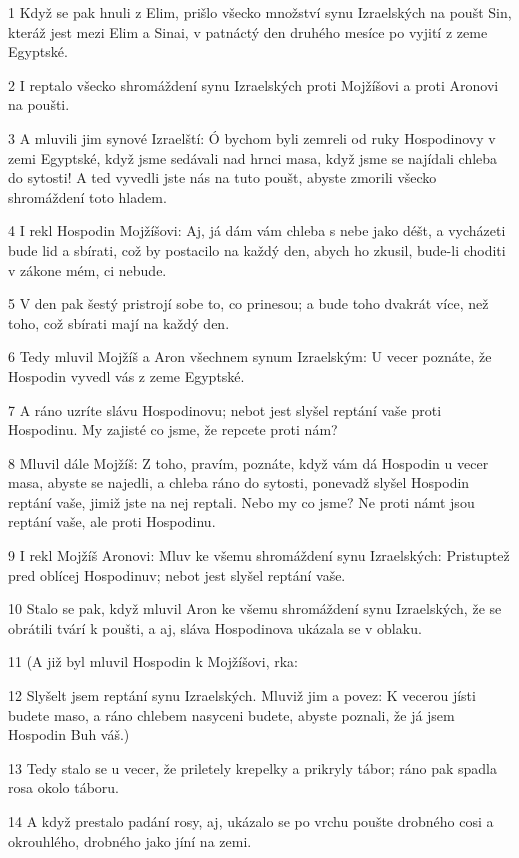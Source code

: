 \par 1 Když se pak hnuli z Elim, prišlo všecko množství synu Izraelských na poušt Sin, kteráž jest mezi Elim a Sinai, v patnáctý den druhého mesíce po vyjití z zeme Egyptské.
\par 2 I reptalo všecko shromáždení synu Izraelských proti Mojžíšovi a proti Aronovi na poušti.
\par 3 A mluvili jim synové Izraelští: Ó bychom byli zemreli od ruky Hospodinovy v zemi Egyptské, když jsme sedávali nad hrnci masa, když jsme se najídali chleba do sytosti! A ted vyvedli jste nás na tuto poušt, abyste zmorili všecko shromáždení toto hladem.
\par 4 I rekl Hospodin Mojžíšovi: Aj, já dám vám chleba s nebe jako déšt, a vycházeti bude lid a sbírati, což by postacilo na každý den, abych ho zkusil, bude-li choditi v zákone mém, ci nebude.
\par 5 V den pak šestý pristrojí sobe to, co prinesou; a bude toho dvakrát více, než toho, což sbírati mají na každý den.
\par 6 Tedy mluvil Mojžíš a Aron všechnem synum Izraelským: U vecer poznáte, že Hospodin vyvedl vás z zeme Egyptské.
\par 7 A ráno uzríte slávu Hospodinovu; nebot jest slyšel reptání vaše proti Hospodinu. My zajisté co jsme, že repcete proti nám?
\par 8 Mluvil dále Mojžíš: Z toho, pravím, poznáte, když vám dá Hospodin u vecer masa, abyste se najedli, a chleba ráno do sytosti, ponevadž slyšel Hospodin reptání vaše, jimiž jste na nej reptali. Nebo my co jsme? Ne proti námt jsou reptání vaše, ale proti Hospodinu.
\par 9 I rekl Mojžíš Aronovi: Mluv ke všemu shromáždení synu Izraelských: Pristuptež pred oblícej Hospodinuv; nebot jest slyšel reptání vaše.
\par 10 Stalo se pak, když mluvil Aron ke všemu shromáždení synu Izraelských, že se obrátili tvárí k poušti, a aj, sláva Hospodinova ukázala se v oblaku.
\par 11 (A již byl mluvil Hospodin k Mojžíšovi, rka:
\par 12 Slyšelt jsem reptání synu Izraelských. Mluviž jim a povez: K vecerou jísti budete maso, a ráno chlebem nasyceni budete, abyste poznali, že já jsem Hospodin Buh váš.)
\par 13 Tedy stalo se u vecer, že priletely krepelky a prikryly tábor; ráno pak spadla rosa okolo táboru.
\par 14 A když prestalo padání rosy, aj, ukázalo se po vrchu poušte drobného cosi a okrouhlého, drobného jako jíní na zemi.
